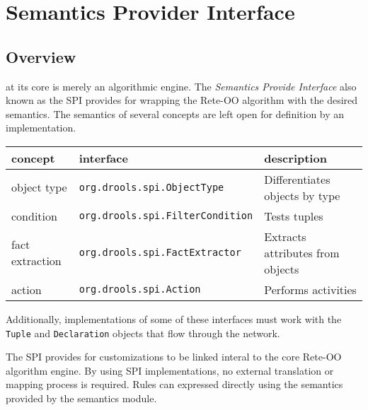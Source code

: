 \section{Semantics Provider Interface}

\subsection{Overview}

\drools{} at its core is merely an algorithmic engine. The 
\emph{Semantics Provide Interface} also known as the SPI
provides for wrapping the \drools{} Rete-OO algorithm with
the desired semantics. The semantics of several concepts are
left open for definition by an implementation.

\bigskip

\begin{center}
  \begin{tabular}{|l|l|p{120pt}|}
    \hline
      \textsf{concept} & \textsf{interface} & \textsf{description} \\
    \hline
    \hline
      \footnotesize{object type} %
        & \texttt{\footnotesize{org.drools.spi.ObjectType}} %
        & \footnotesize{Differentiates objects by type} \\
    \hline
      \footnotesize{condition} %
        & \texttt{\footnotesize{org.drools.spi.FilterCondition}} %
        & \footnotesize{Tests tuples}\\
    \hline
      \footnotesize{fact extraction} %
        & \texttt{\footnotesize{org.drools.spi.FactExtractor}} %
        & \footnotesize{Extracts attributes from objects} \\
    \hline
      \footnotesize{action} %
        & \texttt{\footnotesize{org.drools.spi.Action}} %
        & \footnotesize{Performs activities}\\
    \hline
  \end{tabular}
\end{center}

\bigskip

Additionally, implementations of some of these interfaces must work
with the \verb|Tuple| and \verb|Declaration| objects that flow 
through the network.  

The SPI provides for \drools{} customizations to be linked interal to
the core Rete-OO algorithm engine.  By using SPI implementations, no
external translation or mapping process is required.  Rules can
expressed directly using the semantics provided by the semantics module.

